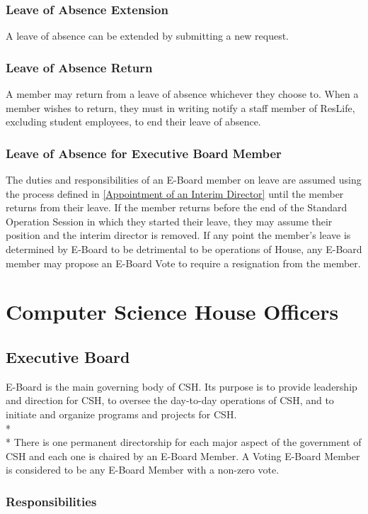 \documentclass{article}
\newcommand{\article}[1]{\section{#1} \label{#1}}
\newcommand{\asection}[1]{\subsection{#1} \label{#1}}
\newcommand{\asubsection}[1]{\subsubsection{#1} \label{#1}}
\begin{document}
\asubsection{Leave of Absence Extension}
A leave of absence can be extended by submitting a new request.

\asubsection{Leave of Absence Return}
A member may return from a leave of absence whichever they choose to.
When a member wishes to return, they must in writing notify a staff member of ResLife, excluding student employees, to end their leave of absence.

\asubsection{Leave of Absence for Executive Board Member}
The duties and responsibilities of an E-Board member on leave are assumed using the process defined in \ref{Appointment of an Interim Director} until the member returns from their leave.
If the member returns before the end of the Standard Operation Session in which they started their leave, they may assume their position and the interim director is removed. %
If any point the member's leave is determined by E-Board to be detrimental to be operations of House, any E-Board member may propose an E-Board Vote to require a resignation from the member.

\article{Computer Science House Officers}

\asection{Executive Board}
E-Board is the main governing body of CSH.
Its purpose is to provide leadership and direction for CSH, to oversee the day-to-day operations of CSH, and to initiate and organize programs and projects for CSH.
\\*\\*
There is one permanent directorship for each major aspect of the government of CSH and each one is chaired by an E-Board Member.
A Voting E-Board Member is considered to be any E-Board Member with a non-zero vote. %

\asubsection{Responsibilities}
\renewcommand{\theenumi}{\alph{enumi}} %
\end{document}
